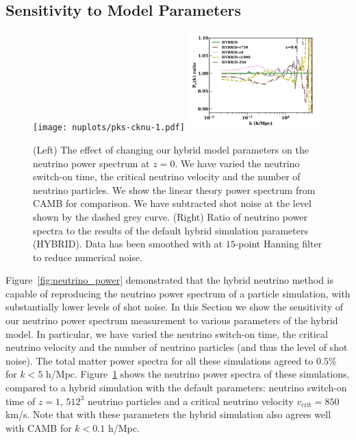 \documentclass[useAMS, usenatbib]{mnras}
\begin{document}
\subsection{Sensitivity to Model Parameters}
\label{sec:check}

\begin{figure}
  \texttt{[image: nuplots/pks-cknu-1.pdf]}
  \includegraphics[width=0.45\textwidth]{nuplots/pks_nu_ckrel-1.pdf}
\caption{(Left) The effect of changing our hybrid model parameters on the neutrino power spectrum at $z=0$. We have varied the neutrino switch-on time, the critical neutrino velocity and the number of neutrino particles. We show the linear theory power spectrum from CAMB for comparison. We have subtracted shot noise at the level shown by the dashed grey curve. (Right) Ratio of neutrino power spectra to the results of the default hybrid simulation parameters (HYBRID). Data has been smoothed with at $15$-point Hanning filter to reduce numerical noise.}
  \label{fig:vcrit}
\end{figure}

Figure~\ref{fig:neutrino_power} demonstrated that the hybrid neutrino method is capable of reproducing the neutrino power spectrum of a particle simulation, with substantially lower levels of shot noise. In this Section we show the sensitivity of our neutrino power spectrum measurement to various parameters of the hybrid model. In particular, we have varied the neutrino switch-on time, the critical neutrino velocity and the number of neutrino particles (and thus the level of shot noise). The total matter power spectra for all these simulations agreed to $0.5\%$ for $k < 5$ h/Mpc. Figure~\ref{fig:vcrit} shows the neutrino power spectra of these simulations, compared to a hybrid simulation with the default parameters: neutrino switch-on time of $z=1$, $512^3$ neutrino particles and a critical neutrino velocity $v_\mathrm{crit} = 850$ km/s. Note that with these parameters the hybrid simulation also agrees well with CAMB for $k < 0.1$ h/Mpc.
\end{document}
